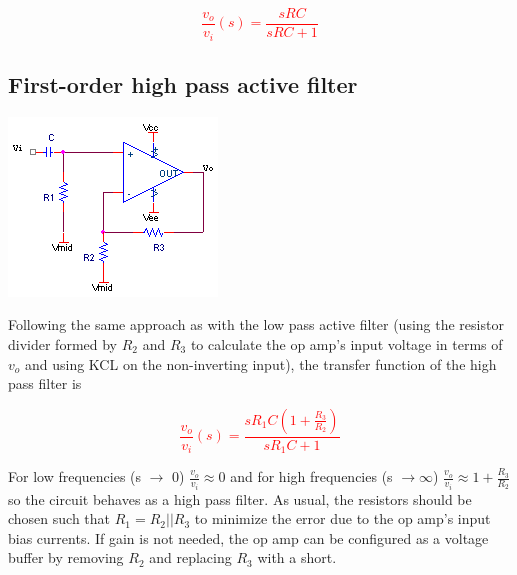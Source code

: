 \textcolor{red}{
\begin{equation}
\frac{v_{o}}{v_{i}}(s) = \frac{sRC}{sRC+1}
\label{eq:rcHPfilter}
\end{equation}
}

\subsection{First-order high pass active filter}
\begin{center}
	\includegraphics{schematics/1storderHPfilter.PNG}
\end{center}
Following the same approach as with the low pass active filter (using the resistor divider formed by $R_{2}$ and $R_{3}$ to calculate the op amp's input voltage in terms of $v_{o}$ and using KCL on the non-inverting input), the transfer function of the high pass filter is

\textcolor{red}{
\begin{equation}\frac{v_{o}}{v_{i}}(s) = \frac{sR_{1}C(1+\frac{R_{3}}{R_{2}})}{sR_{1}C+1}
\label{eq:1storderHPfilter}
\end{equation}
}

For low frequencies (s $\rightarrow$ 0) $\frac{v_{o}}{v_{i}} \approx 0$ and for high frequencies (s $\rightarrow \infty$) $\frac{v_{o}}{v_{i}} \approx 1 + \frac{R_{3}}{R_{2}}$ so the circuit behaves as a high pass filter. As usual, the resistors should be chosen such that $R_{1} = R_{2}||R_{3}$ to minimize the error due to the op amp's input bias currents. If gain is not needed, the op amp can be configured as a voltage buffer by removing $R_{2}$ and replacing $R_{3}$ with a short.

